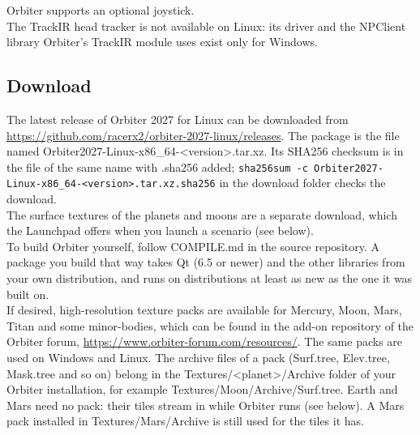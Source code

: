 \documentclass[Orbiter User Manual.tex]{subfiles}
\begin{document}
\noindent
Orbiter supports an optional joystick.\\
The TrackIR head tracker is not available on Linux: its driver and the NPClient library Orbiter's TrackIR module uses exist only for Windows.

\subsection{Download}
The latest release of Orbiter 2027 for Linux can be downloaded from \url{https://github.com/racerx2/orbiter-2027-linux/releases}. The package is the file named Orbiter2027-Linux-x86\_64-<version>.tar.xz. Its SHA256 checksum is in the file of the same name with .sha256 added; \texttt{sha256sum -c Orbiter2027-Linux-x86\_64-<version>.tar.xz.sha256} in the download folder checks the download.\\
The surface textures of the planets and moons are a separate download, which the Launchpad offers when you launch a scenario (see below).\\
To build Orbiter yourself, follow COMPILE.md in the source repository. A package you build that way takes Qt (6.5 or newer) and the other libraries from your own distribution, and runs on distributions at least as new as the one it was built on.\\
If desired, high-resolution texture packs are available for Mercury, Moon, Mars, Titan and some minor-bodies, which can be found in the add-on repository of the Orbiter forum, \url{https://www.orbiter-forum.com/resources/}. The same packs are used on Windows and Linux. The archive files of a pack (Surf.tree, Elev.tree, Mask.tree and so on) belong in the Textures/<planet>/Archive folder of your Orbiter installation, for example Textures/Moon/Archive/Surf.tree. Earth and Mars need no pack: their tiles stream in while Orbiter runs (see below). A Mars pack installed in Textures/Mars/Archive is still used for the tiles it has.
\end{document}
